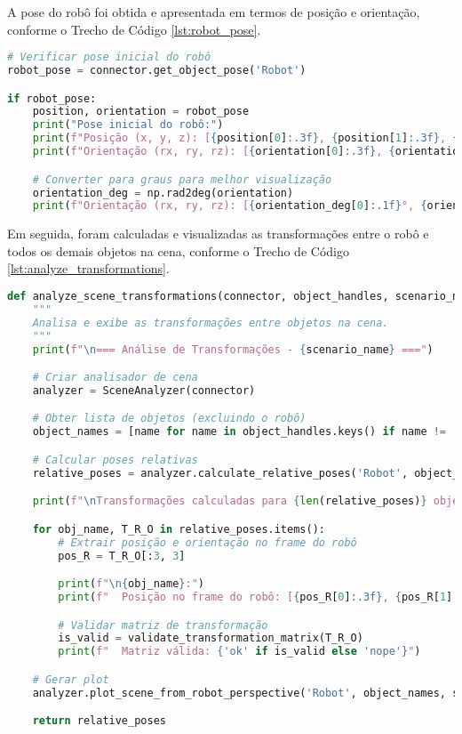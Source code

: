 A pose do robô foi obtida e apresentada em termos de posição e orientação, conforme o Trecho de Código \ref{lst:robot_pose}.

\begin{lstlisting}[language=Python, caption=Obtenção da pose do robô., label=lst:robot_pose]
# Verificar pose inicial do robô
robot_pose = connector.get_object_pose('Robot')

if robot_pose:
    position, orientation = robot_pose
    print("Pose inicial do robô:")
    print(f"Posição (x, y, z): [{position[0]:.3f}, {position[1]:.3f}, {position[2]:.3f}] metros")
    print(f"Orientação (rx, ry, rz): [{orientation[0]:.3f}, {orientation[1]:.3f}, {orientation[2]:.3f}] radianos")

    # Converter para graus para melhor visualização
    orientation_deg = np.rad2deg(orientation)
    print(f"Orientação (rx, ry, rz): [{orientation_deg[0]:.1f}°, {orientation_deg[1]:.1f}°, {orientation_deg[2]:.1f}°]")
\end{lstlisting}

Em seguida, foram calculadas e visualizadas as transformações entre o robô e todos os demais objetos na cena, conforme o Trecho de Código \ref{lst:analyze_transformations}.

\begin{lstlisting}[language=Python, caption=Cálculo das transformações relativas., label=lst:analyze_transformations]
def analyze_scene_transformations(connector, object_handles, scenario_name="Pose Inicial"):
    """
    Analisa e exibe as transformações entre objetos na cena.
    """
    print(f"\n=== Análise de Transformações - {scenario_name} ===")

    # Criar analisador de cena
    analyzer = SceneAnalyzer(connector)

    # Obter lista de objetos (excluindo o robô)
    object_names = [name for name in object_handles.keys() if name != 'Robot']

    # Calcular poses relativas
    relative_poses = analyzer.calculate_relative_poses('Robot', object_names)

    print(f"\nTransformações calculadas para {len(relative_poses)} objetos:")

    for obj_name, T_R_O in relative_poses.items():
        # Extrair posição e orientação no frame do robô
        pos_R = T_R_O[:3, 3]

        print(f"\n{obj_name}:")
        print(f"  Posição no frame do robô: [{pos_R[0]:.3f}, {pos_R[1]:.3f}, {pos_R[2]:.3f}] m")

        # Validar matriz de transformação
        is_valid = validate_transformation_matrix(T_R_O)
        print(f"  Matriz válida: {'ok' if is_valid else 'nope'}")

    # Gerar plot
    analyzer.plot_scene_from_robot_perspective('Robot', object_names, scenario_name)

    return relative_poses
\end{lstlisting}


